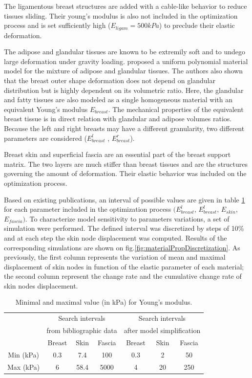 The  ligamentous breast structures are added with a cable-like behavior to reduce tissues sliding. Their young's modulus is also not included in the optimization process and is set sufficiently high ($E_{ligam}=500kPa$) to preclude their elastic deformation. 

The adipose and glandular tissues are known to be extremily soft and to undego large deformation under gravity loading.  \cite{calvo_polynomial_2015} proposed a uniform polynomial material model for the mixture of adipose and glandular tissues. The authors also shown that the breast outer shape deformation does not depend on glandular distribution but is highly dependent on its volumetric ratio. Here, the glandular and fatty tissues are also modeled as a single homogeneous material with an equivalent Young's modulus $E_{breast }$. The mechanical properties of the equivalent breast tissue is in direct relation with glandular and adipose volumes ratios. Because the left and right breasts may have a different granularity, two different parameters are considered ($E_{breast}^l$ , $E_{breast}^r$).

Breast skin and superficial fascia are an essential part of the breast support matrix. The two layers are much stiffer than breast tissues and are the structures governing the amount of deformation. Their elastic behavior was included on the optimization process.

 Based on existing publications, an interval of possible values are given in table \ref{table:minandmaxelasticmodulus} for each parameter included in the optimization process $(E_{breast}^l$, $E_{breast}^l$, $E_{skin}$, $E_{fascia})$. To characterize model sensitivity to parameters variations, a set of simulation were performed. The defined interval was discretized by steps of 10\% and at each step the skin node displacement was computed. Results of the corresponding simulations are shown on fig.\ref{fig:materialPropDiscretization}. As previously, the first column represents  the variation of mean and maximal displacement of skin nodes in function of the elastic parameter of each material; the second column represent the change rate and the cumulative change rate of skin nodes displacement.


\begin{table}[!h]
\centering
\begin{tabular}{|c||c|c|c||c|c|c|}
\hline
&\multicolumn{3}{|c||}{Search intervals}& \multicolumn{3}{c|}{Search intervals}\\
&\multicolumn{3}{|c||}{ from bibliographic data}& \multicolumn{3}{c|}{ after model simplification}\\
\hline
\hline
& Breast & Skin & Fascia & Breast & Skin & Fascia \\
\hline
Min (kPa)  & 0.3 & 7.4 & 100 & 0.3 & 2 & 50\\
\hline
Max (kPa) & 6 & 58.4 & 5000& 4& 20 &250 \\
\hline
\end{tabular}
\caption{Minimal and maximal value (in kPa) for Young’s modulus.}
\label{table:minandmaxelasticmodulus}
\end{table}

